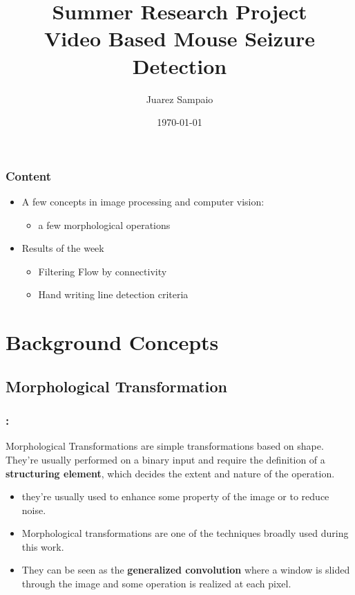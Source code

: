 \documentclass{beamer}
\title{Summer Research Project \\  Video Based Mouse Seizure Detection}
\author{Juarez Sampaio}
\institute{Rice University}
\date{\today}
\begin{document}
\begin{frame}
        \titlepage
\end{frame}

\begin{frame}[fragile]
  \frametitle{Content}
  \begin{itemize}
     \item A few concepts in image processing and computer vision:
       \begin{itemize}
           \item a few morphological operations
       \end{itemize}
     \item Results of the week
       \begin{itemize}
           \item Filtering Flow by connectivity
           \item Hand writing line detection criteria
       \end{itemize}
  \end{itemize}
\end{frame}


\section{Background Concepts}
\subsection{Morphological Transformation}

\begin{frame}
  \frametitle{\secname : \subsecname}
  \begin{definition}
    Morphological Transformations are simple transformations based on shape. They're usually performed on a binary input
    and require the definition of a \textbf{structuring element}, which decides the extent and nature of the operation.
  \end{definition}

  \begin{itemize}
      \item they're usually used to enhance some property of the image or to reduce noise.
      \item Morphological transformations are one of the techniques broadly used during this work.
      \item They can be seen as the \textbf{generalized convolution} where a window is slided through the image and some
        operation is realized at each pixel.
  \end{itemize}
\end{frame}
\end{document}
